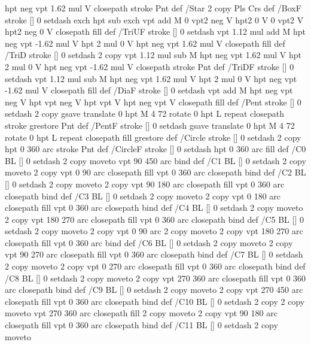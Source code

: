 {{{  hpt neg vpt 1.62 mul V closepath stroke
  Pnt  } def
/Star { 2 copy Pls Crs } def
/BoxF { stroke [] 0 setdash exch hpt sub exch vpt add M
  0 vpt2 neg V  hpt2 0 V  0 vpt2 V
  hpt2 neg 0 V  closepath fill } def
/TriUF { stroke [] 0 setdash vpt 1.12 mul add M
  hpt neg vpt -1.62 mul V
  hpt 2 mul 0 V
  hpt neg vpt 1.62 mul V closepath fill } def
/TriD { stroke [] 0 setdash 2 copy vpt 1.12 mul sub M
  hpt neg vpt 1.62 mul V
  hpt 2 mul 0 V
  hpt neg vpt -1.62 mul V closepath stroke
  Pnt  } def
/TriDF { stroke [] 0 setdash vpt 1.12 mul sub M
  hpt neg vpt 1.62 mul V
  hpt 2 mul 0 V
  hpt neg vpt -1.62 mul V closepath fill} def
/DiaF { stroke [] 0 setdash vpt add M
  hpt neg vpt neg V hpt vpt neg V
  hpt vpt V hpt neg vpt V closepath fill } def
/Pent { stroke [] 0 setdash 2 copy gsave
  translate 0 hpt M 4 {72 rotate 0 hpt L} repeat
  closepath stroke grestore Pnt } def
/PentF { stroke [] 0 setdash gsave
  translate 0 hpt M 4 {72 rotate 0 hpt L} repeat
  closepath fill grestore } def
/Circle { stroke [] 0 setdash 2 copy
  hpt 0 360 arc stroke Pnt } def
/CircleF { stroke [] 0 setdash hpt 0 360 arc fill } def
/C0 { BL [] 0 setdash 2 copy moveto vpt 90 450  arc } bind def
/C1 { BL [] 0 setdash 2 copy        moveto
       2 copy  vpt 0 90 arc closepath fill
               vpt 0 360 arc closepath } bind def
/C2 { BL [] 0 setdash 2 copy moveto
       2 copy  vpt 90 180 arc closepath fill
               vpt 0 360 arc closepath } bind def
/C3 { BL [] 0 setdash 2 copy moveto
       2 copy  vpt 0 180 arc closepath fill
               vpt 0 360 arc closepath } bind def
/C4 { BL [] 0 setdash 2 copy moveto
       2 copy  vpt 180 270 arc closepath fill
               vpt 0 360 arc closepath } bind def
/C5 { BL [] 0 setdash 2 copy moveto
       2 copy  vpt 0 90 arc
       2 copy moveto
       2 copy  vpt 180 270 arc closepath fill
               vpt 0 360 arc } bind def
/C6 { BL [] 0 setdash 2 copy moveto
      2 copy  vpt 90 270 arc closepath fill
              vpt 0 360 arc closepath } bind def
/C7 { BL [] 0 setdash 2 copy moveto
      2 copy  vpt 0 270 arc closepath fill
              vpt 0 360 arc closepath } bind def
/C8 { BL [] 0 setdash 2 copy moveto
      2 copy vpt 270 360 arc closepath fill
              vpt 0 360 arc closepath } bind def
/C9 { BL [] 0 setdash 2 copy moveto
      2 copy  vpt 270 450 arc closepath fill
              vpt 0 360 arc closepath } bind def
/C10 { BL [] 0 setdash 2 copy 2 copy moveto vpt 270 360 arc closepath fill
       2 copy moveto
       2 copy vpt 90 180 arc closepath fill
               vpt 0 360 arc closepath } bind def
/C11 { BL [] 0 setdash 2 copy moveto
}}}
